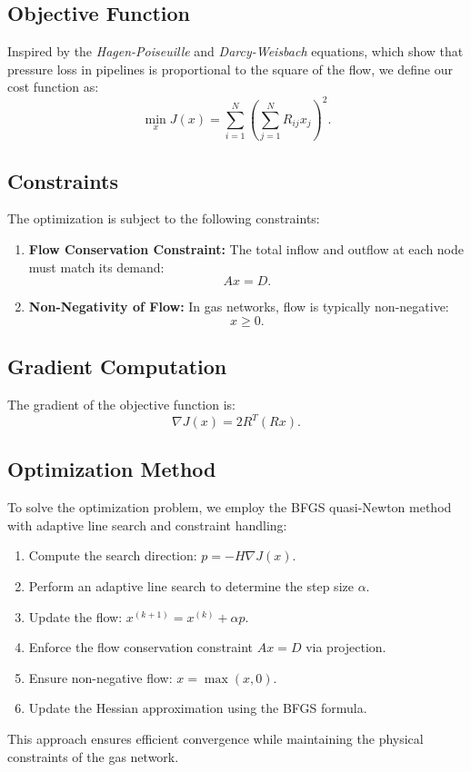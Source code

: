 \documentclass{article}
\begin{document}
\subsection{Objective Function}
Inspired by the \textit{Hagen-Poiseuille} and \textit{Darcy-Weisbach} equations, which show that pressure loss in pipelines is proportional to the square of the flow, we define our cost function as:
\begin{equation}
    \min_{x} J(x) = \sum_{i=1}^{N} \left( \sum_{j=1}^{N} R_{ij} x_j \right)^2.
\end{equation}

\subsection{Constraints}
The optimization is subject to the following constraints:
\begin{enumerate}
    \item \textbf{Flow Conservation Constraint:} The total inflow and outflow at each node must match its demand:
    \begin{equation}
       A x = D.
    \end{equation}
    \item \textbf{Non-Negativity of Flow:} In gas networks, flow is typically non-negative:
    \begin{equation}
       x \geq 0.
    \end{equation}
\end{enumerate}

\subsection{Gradient Computation}
The gradient of the objective function is:
\begin{equation}
    \nabla J(x) = 2 R^T (R x).
\end{equation}

\subsection{Optimization Method}
To solve the optimization problem, we employ the BFGS quasi-Newton method with adaptive line search and constraint handling:
\begin{enumerate}
    \item Compute the search direction: \( p = -H \nabla J(x) \).
    \item Perform an adaptive line search to determine the step size \( \alpha \).
    \item Update the flow: \( x^{(k+1)} = x^{(k)} + \alpha p \).
    \item Enforce the flow conservation constraint \( A x = D \) via projection.
    \item Ensure non-negative flow: \( x = \max(x, 0) \).
    \item Update the Hessian approximation using the BFGS formula.
\end{enumerate}
This approach ensures efficient convergence while maintaining the physical constraints of the gas network.
\end{document}
